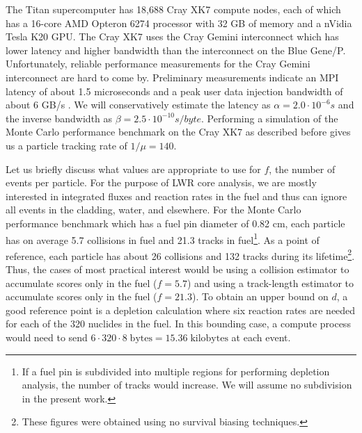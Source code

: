 The Titan supercomputer has 18,688 Cray XK7 compute nodes, each of which has a
16-core AMD Opteron 6274 processor with 32 GB of memory and a nVidia Tesla K20
GPU. The Cray XK7 uses the Cray Gemini interconnect which has lower latency and
higher bandwidth than the interconnect on the Blue Gene/P. Unfortunately,
reliable performance measurements for the Cray Gemini interconnect are hard to
come by. Preliminary measurements indicate an MPI latency of about 1.5
microseconds and a peak user data injection bandwidth of about 6 GB/s
\cite{hlrs-workshop-2011}. We will conservatively estimate the latency as
$\alpha = 2.0 \cdot 10^{-6} \unit{s}$ and the inverse bandwidth as $\beta = 2.5
\cdot 10^{-10} \unit{s/byte}$. Performing a simulation of the Monte Carlo
performance benchmark on the Cray XK7 as described before gives us a particle
tracking rate of $1/\mu = 140$.

Let us briefly discuss what values are appropriate to use for $f$, the number of
events per particle. For the purpose of LWR core analysis, we are mostly
interested in integrated fluxes and reaction rates in the fuel and thus can
ignore all events in the cladding, water, and elsewhere. For the Monte Carlo
performance benchmark which has a fuel pin diameter of 0.82 cm, each particle
has on average 5.7 collisions in fuel and 21.3 tracks in fuel\footnote{If a fuel
  pin is subdivided into multiple regions for performing depletion analysis, the
  number of tracks would increase. We will assume no subdivision in the present
  work.}. As a point of reference, each particle has about 26 collisions and 132
tracks during its lifetime\footnote{These figures were obtained using no
  survival biasing techniques.}. Thus, the cases of most practical interest
would be using a collision estimator to accumulate scores only in the fuel ($f =
5.7$) and using a track-length estimator to accumulate scores only in the fuel
($f = 21.3$). To obtain an upper bound on $d$, a good reference point is a
depletion calculation where six reaction rates are needed for each of the 320
nuclides in the fuel. In this bounding case, a compute process would need to
send $6 \cdot 320 \cdot 8 \; \text{bytes} = 15.36 \; \text{kilobytes}$ at each
event.

